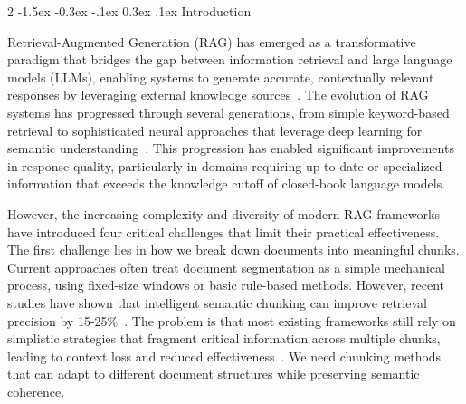 \documentclass[10pt,letterpaper]{article}
\makeatletter
\let\cite\citep
\renewcommand{\section}{\@startsection{section}{1}{\z@}%
                                   {-1.5ex \@plus -0.3ex \@minus -.1ex}%
                                   {0.3ex \@plus.1ex}%
                                   {\normalfont\large\bfseries}}
\makeatother
\begin{document}
\vspace{0.5cm}

\begin{multicols}{2}
\setlength{\parindent}{0pt}
\section{Introduction}

Retrieval-Augmented Generation (RAG) has emerged as a transformative paradigm that bridges the gap between information retrieval and large language models (LLMs), enabling systems to generate accurate, contextually relevant responses by leveraging external knowledge sources~\cite{lewis2020retrieval}. The evolution of RAG systems has progressed through several generations, from simple keyword-based retrieval to sophisticated neural approaches that leverage deep learning for semantic understanding~\cite{vaswani2017attention,devlin2019bert}. This progression has enabled significant improvements in response quality, particularly in domains requiring up-to-date or specialized information that exceeds the knowledge cutoff of closed-book language models.

However, the increasing complexity and diversity of modern RAG frameworks have introduced four critical challenges that limit their practical effectiveness. The first challenge lies in how we break down documents into meaningful chunks. Current approaches often treat document segmentation as a simple mechanical process, using fixed-size windows or basic rule-based methods. However, recent studies have shown that intelligent semantic chunking can improve retrieval precision by 15-25\%~\cite{qu2024semantic, zhang2024semantic, liu2024impact}. The problem is that most existing frameworks still rely on simplistic strategies that fragment critical information across multiple chunks, leading to context loss and reduced effectiveness~\cite{smith2023fixed, johnson2023rule}. We need chunking methods that can adapt to different document structures while preserving semantic coherence.


\end{multicols}
\end{document}
